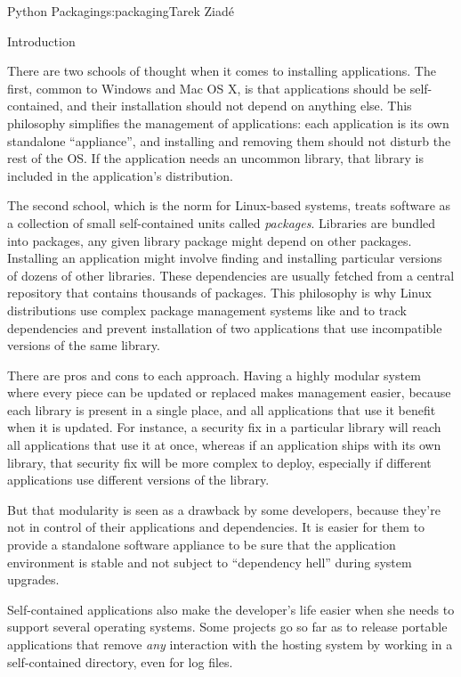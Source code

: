 \begin{aosachapter}{Python Packaging}{s:packaging}{Tarek Ziad\'{e}}

\begin{aosasect1}{Introduction}

There are two schools of thought when it comes to installing
applications.  The first, common to Windows and Mac OS X, is that
applications should be self-contained, and their installation should
not depend on anything else.  This philosophy simplifies the
management of applications: each application is its own standalone
``appliance'', and installing and removing them should not disturb the
rest of the OS\@.  If the application needs an uncommon library, that
library is included in the application's distribution.

The second school, which is the norm for Linux-based systems, treats
software as a collection of small self-contained units called
\emph{packages}. Libraries are bundled into packages, any given
library package might depend on other packages.
Installing an application might involve finding and installing
particular versions of dozens of other libraries.  These dependencies
are usually fetched from a central repository that contains thousands
of packages.  This philosophy is why Linux distributions use complex
package management systems like  and  to track
dependencies and prevent installation of two applications that use
incompatible versions of the same library.

There are pros and cons to each approach.  Having a highly modular
system where every piece can be updated or replaced makes management
easier, because each library is present in a single place, and all
applications that use it benefit when it is updated.  For instance, a
security fix in a particular library will reach all applications that
use it at once, whereas if an application ships with its own library,
that security fix will be more complex to deploy, especially if
different applications use different versions of the library.

But that modularity is seen as a drawback by some developers, because
they're not in control of their applications and dependencies.  It is
easier for them to provide a standalone software appliance to be sure
that the application environment is stable and not subject to
``dependency hell'' during system upgrades.

Self-contained applications also make the developer's life easier when
she needs to support several operating systems.  Some projects go so
far as to release portable applications that remove \emph{any}
interaction with the hosting system by working in a self-contained
directory, even for log files.


\end{aosasect1}
\end{aosachapter}
